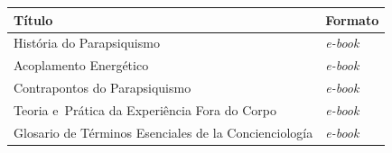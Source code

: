 \documentclass{gescons}
\begin{document}
\begin{longtable}[]{@{}
  >{\raggedright\arraybackslash}p{}
  >{\raggedright\arraybackslash}p{}@{}}
\toprule\noalign{}
\begin{minipage}[t]{\linewidth}\centering
\textbf{Título}
\end{minipage} & \begin{minipage}[t]{\linewidth}\centering
\textbf{Formato}
\end{minipage} \\
\hline
\begin{minipage}[t]{\linewidth}\raggedright
História do Parapsiquismo
\end{minipage} & \begin{minipage}[t]{\linewidth}\centering
\emph{e-book}
\end{minipage} \\
\hline
\begin{minipage}[t]{\linewidth}\raggedright
Acoplamento Energético
\end{minipage} & \begin{minipage}[t]{\linewidth}\centering
\emph{e-book}
\end{minipage} \\
\hline
\begin{minipage}[t]{\linewidth}\raggedright
Contrapontos do Parapsiquismo
\end{minipage} & \begin{minipage}[t]{\linewidth}\centering
\emph{e-book}
\end{minipage} \\
\hline
\begin{minipage}[t]{\linewidth}\raggedright
Teoria e~Prática da Experiência Fora do Corpo
\end{minipage} & \begin{minipage}[t]{\linewidth}\centering
\emph{e-book}
\end{minipage} \\
\hline
\begin{minipage}[t]{\linewidth}\raggedright
Glosario de Términos Esenciales de la Concienciología
\end{minipage} & \begin{minipage}[t]{\linewidth}\centering
\emph{e-book}
\end{minipage} \\

\end{longtable}
\end{document}
